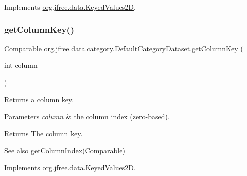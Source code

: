 Implements \mbox{\hyperlink{interfaceorg_1_1jfree_1_1data_1_1_keyed_values2_d_a3360f2f612f16e8c90409d65e3992d38}{org.\+jfree.\+data.\+Keyed\+Values2D}}.

\mbox{\label{classorg_1_1jfree_1_1data_1_1category_1_1_default_category_dataset_a830798ee850da00ea96dcf29f28c70e7}} 
\subsubsection{\texorpdfstring{get\+Column\+Key()}{getColumnKey()}}
{\footnotesize\ttfamily Comparable org.\+jfree.\+data.\+category.\+Default\+Category\+Dataset.\+get\+Column\+Key (\begin{DoxyParamCaption}\item[{int}]{column }\end{DoxyParamCaption})}

Returns a column key.


\begin{DoxyParams}{Parameters}
{\em column} & the column index (zero-\/based).\\
\hline
\end{DoxyParams}
\begin{DoxyReturn}{Returns}
The column key.
\end{DoxyReturn}
\begin{DoxySeeAlso}{See also}
\mbox{\hyperlink{classorg_1_1jfree_1_1data_1_1category_1_1_default_category_dataset_abd03d702aa033c675c043d04578fdd16}{get\+Column\+Index(\+Comparable)}} 
\end{DoxySeeAlso}


Implements \mbox{\hyperlink{interfaceorg_1_1jfree_1_1data_1_1_keyed_values2_d_a9ced6cbaf04f048db059e1ebf5184d2a}{org.\+jfree.\+data.\+Keyed\+Values2D}}.

\mbox{\label{classorg_1_1jfree_1_1data_1_1category_1_1_default_category_dataset_aca704a2ac8b38d61e38b2c0e843024f0}} 
